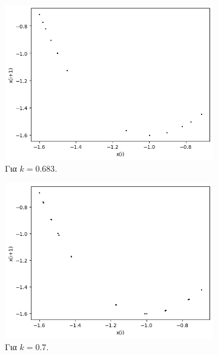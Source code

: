 \begin{figure}[h!]
	\centering
	
	\begin{subfigure}[b]{0.4\textwidth}
		\centering
		\includegraphics[width=\textwidth]{LateX images/graphs q16/g13}
		\caption{Για $k=0.683$.}
		\label{f:k84}
	\end{subfigure}
	\hfill
	\begin{subfigure}[b]{0.4\textwidth}
		\centering
		\includegraphics[width=\textwidth]{LateX images/graphs q16/g14}
		\caption{Για $k=0.7$.}
		\label{f:k85}
	\end{subfigure}
	\hfill
	\begin{subfigure}[b]{0.4\textwidth}
		\centering

\end{subfigure}
\end{figure}

